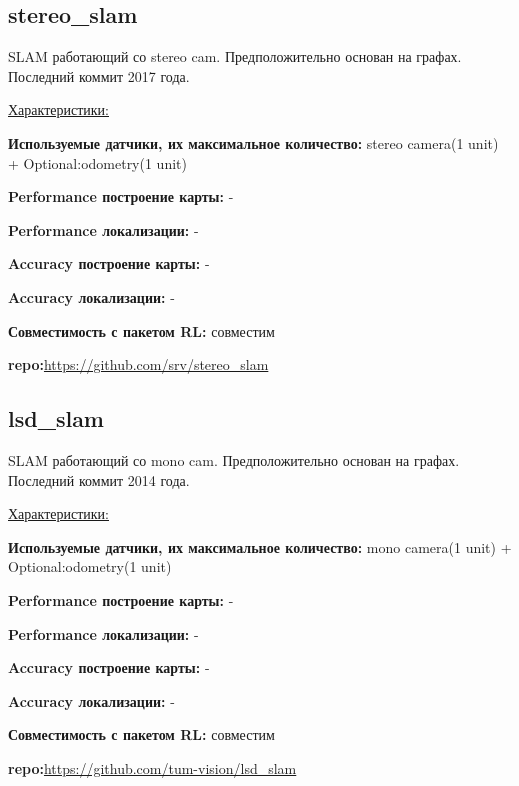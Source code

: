 \documentclass[a4paper, 14pt]{extreport}
\begin{document}
\subsection{stereo\_slam}
\par SLAM работающий со stereo cam. Предположительно основан на графах. Последний коммит 2017 года.
\vspace{2mm}
\par\noindent \underline{Характеристики:}
\par\textbf{Используемые датчики, их максимальное количество:} stereo camera(1 unit) + Optional:odometry(1 unit)
\par\textbf{Performance построение карты:} -
\par\textbf{Performance локализации:} -
\par\textbf{Accuracy построение карты:} -
\par\textbf{Accuracy локализации:} -
\par\textbf{Совместимость с пакетом RL:} совместим
\par\textbf{repo:}\url{https://github.com/srv/stereo_slam}
\subsection{lsd\_slam}
\par SLAM работающий со mono cam. Предположительно основан на графах. Последний коммит 2014 года.
\vspace{2mm}
\par\noindent \underline{Характеристики:}
\par\textbf{Используемые датчики, их максимальное количество:} mono camera(1 unit) + Optional:odometry(1 unit)
\par\textbf{Performance построение карты:} -
\par\textbf{Performance локализации:} -
\par\textbf{Accuracy построение карты:} -
\par\textbf{Accuracy локализации:} -
\par\textbf{Совместимость с пакетом RL:} совместим
\par\textbf{repo:}\url{https://github.com/tum-vision/lsd_slam}
\end{document}
